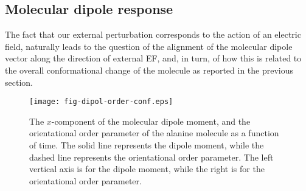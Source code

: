 \documentclass[journal=jctcce,manuscript=manuscript]{achemso}
\begin{document}
\subsection{Molecular dipole response}
The fact that our external perturbation corresponds to the action of
an electric field, naturally leads to the question 
  of the alignment of the molecular dipole vector along the direction of external EF, and, in turn, of how this is related
to the overall conformational change of the molecule as reported in
the previous section.
\begin{figure}
  \centering
  \texttt{[image: fig-dipol-order-conf.eps]}
  \caption{The
    $x$-component of the molecular dipole moment, and the orientational order parameter
    of the alanine molecule as a
    function of time. The solid line represents the dipole moment,
    while the dashed line represents the orientational order parameter.
    The left vertical axis is for the dipole moment, while
    the right is for the orientational order parameter.
  }
  \label{fig:tmp3}
\end{figure}
\end{document}
